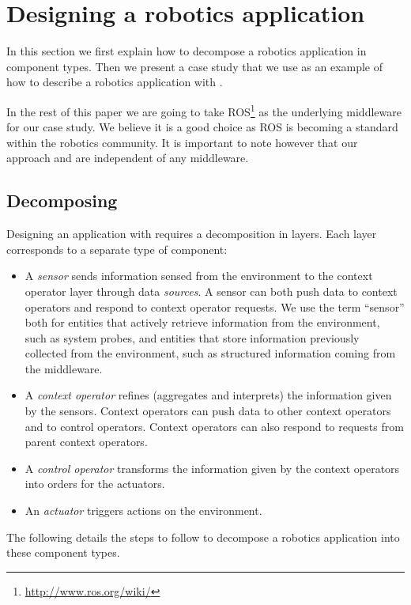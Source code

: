 \section{Designing a robotics application}
\label{sec:designing}

In this section we first explain how to decompose a robotics
application in \diaspec{} component types. Then we present a case
study that we use as an example of how to describe a robotics
application with \diaspec{}.

In the rest of this paper we are going to take
ROS\footnote{\url{http://www.ros.org/wiki/}} as the underlying
middleware for our case study. We believe it is a good choice as ROS
is becoming a standard within the robotics community. It is important
to note however that our approach and \diaspec{} are independent of
any middleware.

\subsection{Decomposing}

Designing an application with \diaspec{} requires a decomposition in
layers. Each layer corresponds to a separate type of component:

\begin{itemize}
\item A \emph{sensor} sends information sensed from the environment to
  the context operator layer through data \emph{sources}. A sensor can
  both push data to context operators and respond to context operator
  requests. We use the term ``sensor'' both for entities that actively
  retrieve information from the environment, such as system probes,
  and entities that store information previously collected from the
  environment, such as structured information coming from the
  middleware.
\item A \emph{context operator} refines (aggregates and interprets)
  the information given by the sensors. Context operators can push
  data to other context operators and to control operators. Context
  operators can also respond to requests from parent context
  operators.
\item A \emph{control operator} transforms the information given by
  the context operators into orders for the actuators.
\item An \emph{actuator} triggers actions on the environment.
\end{itemize}

The following details the steps to follow to decompose a robotics
application into these component types.

